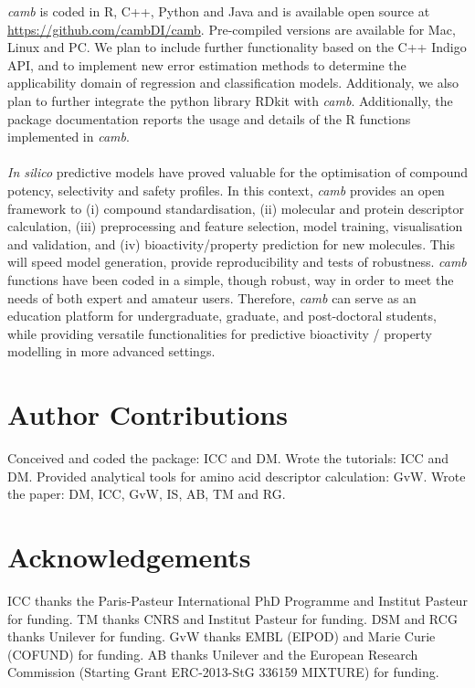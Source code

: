 \documentclass[twoside,a4wide,10pt]{article}
\begin{document}
{\it camb} is coded in R, C++, Python and Java and is available open source
at \url{https://github.com/cambDI/camb}.
Pre-compiled versions are available for Mac, Linux and PC.
We plan to include further functionality based on the C++ Indigo API,
and to implement new error estimation methods to determine the applicability domain of
regression and classification models.
Additionaly, we also plan to further integrate the python library RDkit with {\it camb}.
Additionally, the package documentation reports the usage and details of the R functions implemented in {\it camb}.\\
\\
{\it In silico} predictive models have proved valuable
for the optimisation of compound potency, selectivity and safety profiles.
In this context, {\it camb} provides an open framework
to (i) compound standardisation, (ii) molecular and protein descriptor calculation,
(iii) preprocessing and feature selection, model training, visualisation and validation, and 
(iv) bioactivity/property prediction for new molecules.
This will speed model generation, provide reproducibility and tests of robustness.
{\it camb} functions have been coded in a simple, though robust, way
in order to meet the needs of both expert and amateur users. 
Therefore, {\it camb} can serve as an education platform for 
undergraduate, graduate, and post-doctoral students,
while providing versatile functionalities for predictive bioactivity / property modelling
in more advanced settings.






\section*{{\bf Author Contributions}}

Conceived and coded the package: ICC and DM.
Wrote the tutorials: ICC and DM.
Provided analytical tools for amino acid descriptor calculation: GvW.
Wrote the paper: DM, ICC, GvW, IS, AB, TM and RG.

\section*{{\bf Acknowledgements}}
ICC thanks the Paris-Pasteur International PhD Programme and Institut Pasteur for funding.
TM thanks CNRS and Institut Pasteur for funding.
DSM and RCG thanks Unilever for funding.
GvW thanks EMBL (EIPOD) and Marie Curie (COFUND) for funding.
AB thanks Unilever and the European Research Commission (Starting Grant ERC-2013-StG 336159 MIXTURE) for funding.
\end{document}
